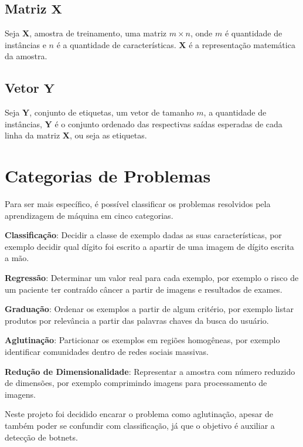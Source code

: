 \subsection{Matriz \(\mathbf{X}\)}
Seja \(\mathbf{X}\), amostra de treinamento, uma matriz \(m \times n\), onde \(m\) é quantidade de instâncias e \(n\) é a quantidade de características. \(\mathbf{X}\) é a representação matemática da amostra.

\subsection{Vetor \(\mathbf{Y}\)}
Seja \(\mathbf{Y}\), conjunto de etiquetas, um vetor de tamanho \(m\), a quantidade de instâncias, \(\mathbf{Y}\) é o conjunto ordenado das respectivas saídas esperadas de cada linha da matriz \(\mathbf{X}\), ou seja as etiquetas.


\section{Categorias de Problemas}

Para ser mais específico, é possível classificar os problemas resolvidos pela aprendizagem de máquina em cinco categorias\cite{mohri2012foundations}.

\begin{description}
\item \textbf{Classificação}: Decidir a classe de exemplo dadas as suas características, por exemplo decidir qual dígito foi escrito a apartir de uma imagem de dígito escrita a mão.
\item \textbf{Regressão}: Determinar um valor real para cada exemplo, por exemplo o risco de um paciente ter contraído câncer a partir de imagens e resultados de exames.
\item \textbf{Graduação}: Ordenar os exemplos a partir de algum critério, por exemplo listar produtos por relevância a partir das palavras chaves da busca do usuário.
\item \textbf{Aglutinação}: Particionar os exemplos em regiões homogêneas, por exemplo identificar comunidades dentro de redes sociais massivas.
\item \textbf{Redução de Dimensionalidade}: Representar a amostra com número reduzido de dimensões, por exemplo comprimindo imagens para processamento de imagens.
\end{description}

Neste projeto foi decidido encarar o problema como aglutinação, apesar de também poder se confundir com classificação, já que o objetivo é auxiliar a detecção de botnets.

